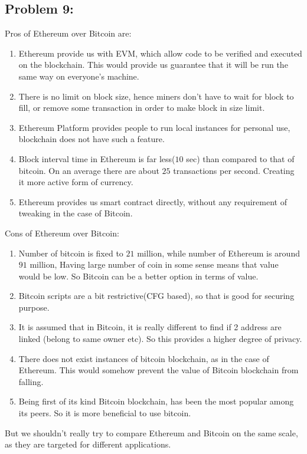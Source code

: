 \documentclass[a4paper]{article}
\begin{document}
\subsection*{Problem 9:}

Pros of Ethereum over Bitcoin are:
\begin{enumerate}
    \item Ethereum provide us with EVM, which allow code to be verified and executed on the blockchain. This would
          provide us guarantee that it will be run the same way on everyone's machine.
    \item There is no limit on block size, hence miners don't have to wait for block to fill, or
          remove some transaction in order to make block in size limit.
    \item Ethereum Platform provides people to run local instances for personal use, blockchain does
          not have such a feature.
    \item Block interval time in Ethereum is far less($10$ sec) than compared to that of bitcoin. On an
          average there are about $25$ transactions per second. Creating it more active form of currency.
    \item Ethereum provides us smart contract directly, without any requirement of tweaking in the case of
          Bitcoin.
\end{enumerate}

Cons of Ethereum over Bitcoin:
\begin{enumerate}
    \item Number of bitcoin is fixed to $21$ million, while number of Ethereum is around $91$ million,
          Having large number of coin in some sense means that value would be low. So Bitcoin can be a better option
          in terms of value.
    \item Bitcoin scripts are a bit restrictive(CFG based), so that is good for securing purpose.
    \item It is assumed that in Bitcoin, it is really different to find if 2 address are linked (belong to same owner etc).
          So this provides a higher degree of privacy. 
    \item There does not exist instances of bitcoin blockchain, as in the case of Ethereum. This would somehow
          prevent the value of Bitcoin blockchain from falling.
    \item Being first of its kind Bitcoin blockchain, has been the most popular among its peers. So it is more
          beneficial to use bitcoin.
\end{enumerate}

But we shouldn't really try to compare Ethereum and Bitcoin on the same scale,
as they are targeted for different applications.
\end{document}
